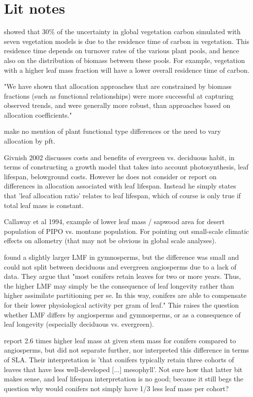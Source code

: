 \documentclass[a4paper]{article}
\begin{document}
\section{Lit notes}

\cite{friend_carbon_2014} showed that 30\% of the uncertainty in global vegetation carbon simulated with seven vegetation models is due to the residence time of carbon in vegetation. This residence time depends on turnover rates of the various plant pools, and hence also on the distribution of biomass between these pools. For example, vegetation with a higher leaf mass fraction will have a lower overall residence time of carbon.

\cite{de2014does} "We have shown that allocation approaches that are constrained by biomass fractions (such as functional relationships) were more successful at capturing observed trends, and were generally more robust, than approaches based on allocation coefficients."

\cite{friedlingstein_toward_1999} make no mention of plant functional type differences or the need to vary allocation by pft.

Givnish 2002 discusses costs and benefits of evergreen vs. deciduous habit, in terms of constructing a growth model that takes into account photosynthesis, leaf lifespan, belowground costs. However he does not consider or report on differences in allocation associated with leaf lifespan. Instead he simply states that 'leaf allocation ratio' relates to leaf lifespan, which of course is only true if total leaf mass is constant.

Callaway et al 1994, example of lower leaf mass / sapwood area for desert population of PIPO vs. montane population. For pointing out small-scale climatic effects on allometry (that may not be obvious in global scale analyses).

\cite{poorter_biomass_2012} found a slightly larger LMF in gymnosperms, but the difference was small and could not split between deciduous and evergreen angiosperms due to a lack of data. They argue that "most conifers retain leaves for two or more years. Thus, the higher LMF may simply be the consequence of leaf longevity rather than higher assimilate partitioning per se. In this way, conifers are able to compensate for their lower physiological activity per gram of leaf." This raises the question whether LMF differs by angiosperms and gymnosperms, or as a consequence of leaf longevity (especially deciduous vs. evergreen).

\cite{enquist_global_2002} report 2.6 times higher leaf mass at given stem mass for conifers compared to angiosperms, but did not separate further, nor interpreted this difference in terms of SLA. Their interpretation is 'that conifers typically retain three cohorts of leaves that have less well-developed [...] mesophyll'. Not sure how that latter bit makes sense, and leaf lifespan interpretation is no good; because it still begs the question why would conifers not simply have 1/3 less leaf mass per cohort? 
\end{document}
